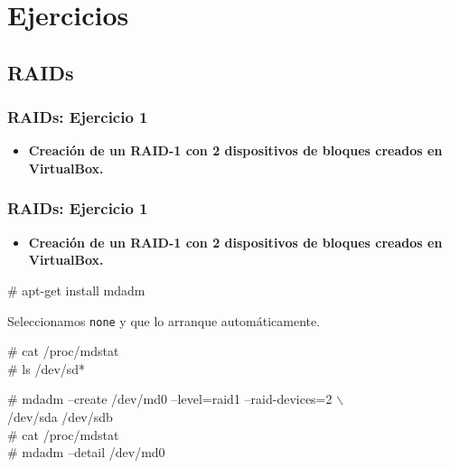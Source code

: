 \documentclass{beamer}
\begin{document}
\section{Ejercicios}


\subsection{RAIDs}

\begin{frame}
  \frametitle{RAIDs: Ejercicio 1}

\begin{itemize}
\item \textbf{Creación de un RAID-1 con 2 dispositivos de bloques creados en VirtualBox.}
\end{itemize}

\end{frame}


\begin{frame}
  \frametitle{RAIDs: Ejercicio 1}

\begin{itemize}
\item \textbf{Creación de un RAID-1 con 2 dispositivos de bloques creados en VirtualBox.}
\end{itemize}

\pause

  \begin{block}{}
\# apt-get install mdadm
  \end{block}
Seleccionamos \texttt{none} y que lo arranque automáticamente.

  \begin{block}{}
\# cat /proc/mdstat \\

\# ls /dev/sd*

\# mdadm --create /dev/md0 --level=raid1 --raid-devices=2 $\backslash$ \\ \hspace{1cm} /dev/sda /dev/sdb \\
\# cat /proc/mdstat \\
\# mdadm --detail /dev/md0
  \end{block}
\end{frame}


\end{document}
